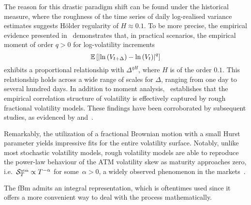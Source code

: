 The reason for this drastic paradigm shift can be found under the historical measure, where the roughness of the time series of daily log-realised variance estimates suggests H{\"o}lder regularity of $H\approx 0.1$. To be more precise, the empirical evidence presented in~\cite{Gatheral2018VolatilityRough} demonstrates that, in practical scenarios, the empirical moment of order $q>0$ for log-volatility increments
\[
\mathbb{E}\left[\left\lvert \ln \left(V_{t+\Delta}\right)-\ln \left(V_t\right)\right\rvert^q\right]
\]
exhibits a proportional relationship with $\Delta^{q H}$, where $H$ is of the order $0.1$. This relationship holds across a wide range of scales for $\Delta$, ranging from one day to several hundred days. In addition to moment analysis,~\cite{Gatheral2018VolatilityRough} establishes that the empirical correlation structure of volatility is effectively captured by rough fractional volatility models. These findings have been corroborated by subsequent studies, as evidenced by \cite{Bennedsen2022DecouplingVolatility} and~\cite{Livieri2018RoughPrices}. 

Remarkably, the utilization of a fractional Brownian motion with a small Hurst parameter yields impressive fits for the entire volatility surface. Notably, unlike most stochastic volatility models, rough volatility models are able to reproduce the power-law behaviour of the ATM volatility skew as maturity approaches zero, i.e.~$\mathcal{S}^{\textup{\tiny atm}}_T \propto T^{-\alpha}$ for some~$\alpha>0$, a widely observed phenomenon in the markets~\cite{Bayer2015PricingVolatility, Gatheral2018VolatilityRough}.

The fBm admits an integral representation, which is oftentimes used since it offers a more convenient way to deal with the process mathematically.

